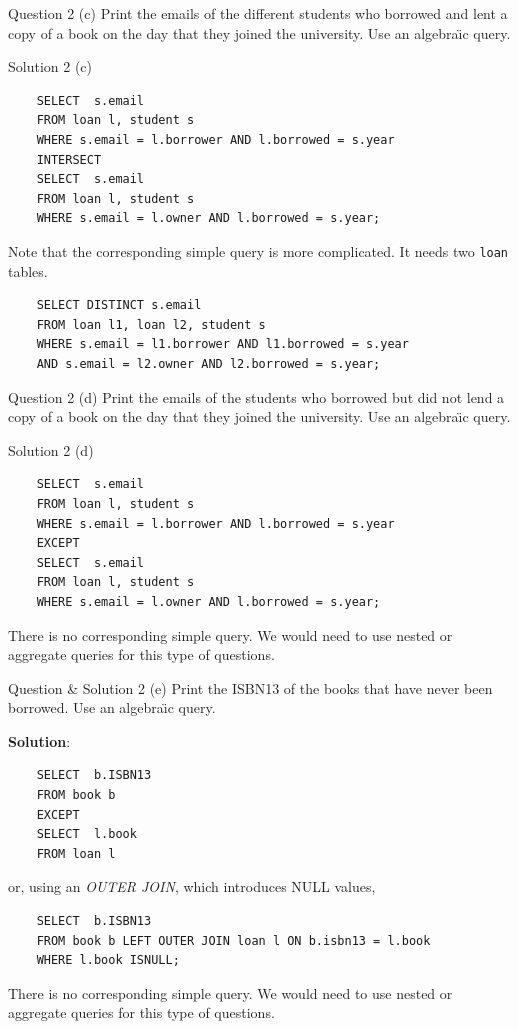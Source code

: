 \begin{frame}[fragile]{Question 2 (c)}
Print the emails of the different students who borrowed and lent a copy of a book on the day that they joined the university. Use an algebra\"{\i}c query.
\end{frame}

\begin{frame}[fragile]{Solution 2 (c)}
\begin{lstlisting}
	SELECT  s.email 
	FROM loan l, student s 
	WHERE s.email = l.borrower AND l.borrowed = s.year
	INTERSECT
	SELECT  s.email 
	FROM loan l, student s 
	WHERE s.email = l.owner AND l.borrowed = s.year;
\end{lstlisting}


Note that the corresponding simple query is more complicated. It needs two \texttt{loan} tables.

\begin{lstlisting}
	SELECT DISTINCT s.email 
	FROM loan l1, loan l2, student s 
	WHERE s.email = l1.borrower AND l1.borrowed = s.year 
	AND s.email = l2.owner AND l2.borrowed = s.year;
\end{lstlisting}
\end{frame}

\begin{frame}[fragile]{Question 2 (d)}
Print the emails of the students who borrowed but did not lend a copy of a book on the day that they joined the university. Use an algebra\"{\i}c query.
\end{frame}

\begin{frame}[fragile]{Solution 2 (d)}
\begin{lstlisting}
	SELECT  s.email 
	FROM loan l, student s 
	WHERE s.email = l.borrower AND l.borrowed = s.year
	EXCEPT
	SELECT  s.email 
	FROM loan l, student s 
	WHERE s.email = l.owner AND l.borrowed = s.year;
\end{lstlisting}

There is no corresponding simple query. We would need to use nested or aggregate queries for this type of questions.
\end{frame}

\begin{frame}[fragile]{Question \& Solution 2 (e)}
Print the ISBN13 of the books that have never been borrowed. Use an algebra\"{\i}c query.

\textbf{Solution}:
\begin{lstlisting}
	SELECT  b.ISBN13 
	FROM book b
	EXCEPT
	SELECT  l.book 
	FROM loan l
\end{lstlisting}

or, using an \textit{OUTER JOIN}, which introduces NULL values,

\begin{lstlisting}
	SELECT  b.ISBN13 
	FROM book b LEFT OUTER JOIN loan l ON b.isbn13 = l.book
	WHERE l.book ISNULL;
\end{lstlisting}

There is no corresponding simple query. We would need to use nested or aggregate queries for this type of questions.

\end{frame}

